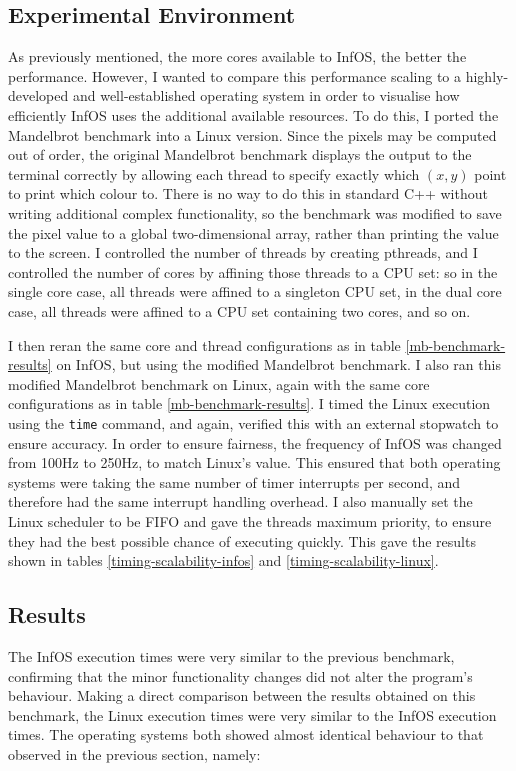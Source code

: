 \documentclass[bsc,frontabs,singlespacing,parskip,deptreport]{infthesis}     %
\begin{document}
\subsection{Experimental Environment} 
As previously mentioned, the more cores available to InfOS, the better the performance. However, I wanted to compare this performance scaling to a highly-developed and well-established operating system in order to visualise how efficiently InfOS uses the additional available resources. To do this, I ported the Mandelbrot benchmark into a Linux version. Since the pixels may be computed out of order, the original Mandelbrot benchmark displays the output to the terminal correctly by allowing each thread to specify exactly which $(x,y)$ point to print which colour to. There is no way to do this in standard C++ without writing additional complex functionality, so the benchmark was modified to save the pixel value to a global two-dimensional array, rather than printing the value to the screen. I controlled the number of threads by creating pthreads, and I controlled the number of cores by affining those threads to a CPU set: so in the single core case, all threads were affined to a singleton CPU set, in the dual core case, all threads were affined to a CPU set containing two cores, and so on.

I then reran the same core and thread configurations as in table \ref{mb-benchmark-results} on InfOS, but using the modified Mandelbrot benchmark. I also ran this modified Mandelbrot benchmark on Linux, again with the same core configurations as in table \ref{mb-benchmark-results}. I timed the Linux execution using the \verb|time| command, and again, verified this with an external stopwatch to ensure accuracy. In order to ensure fairness, the frequency of InfOS was changed from 100Hz to 250Hz, to match Linux's value. This ensured that both operating systems were taking the same number of timer interrupts per second, and therefore had the same interrupt handling overhead. I also manually set the Linux scheduler to be FIFO and gave the threads maximum priority, to ensure they had the best possible chance of executing quickly. This gave the results shown in tables \ref{timing-scalability-infos} and \ref{timing-scalability-linux}.

\subsection{Results}

The InfOS execution times were very similar to the previous benchmark, confirming that the minor functionality changes did not alter the program's behaviour. Making a direct comparison between the results obtained on this benchmark, the Linux execution times were very similar to the InfOS execution times. The operating systems both showed almost identical behaviour to that observed in the previous section, namely:
\end{document}
